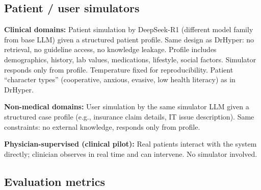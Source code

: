 \documentclass[11pt,a4paper]{article}
\newcommand{\placeholder}[1]{%
  \begin{tcolorbox}[colback=yellow!10,colframe=orange!60!black,
    fonttitle=\bfseries,title=Placeholder]
    #1
  \end{tcolorbox}%
}
\begin{document}
\subsection{Patient / user simulators}
\label{sec:methods_simulators}

\placeholder{%
  \textbf{Clinical domains:}
  Patient simulation by DeepSeek-R1 (different model family from base LLM)
  given a structured patient profile. Same design as DrHyper: no retrieval,
  no guideline access, no knowledge leakage. Profile includes demographics,
  history, lab values, medications, lifestyle, social factors. Simulator
  responds only from profile. Temperature fixed for reproducibility.
  Patient ``character types'' (cooperative, anxious, evasive, low health
  literacy) as in DrHyper.

  \textbf{Non-medical domains:}
  User simulation by the same simulator LLM given a structured case profile
  (e.g., insurance claim details, IT issue description). Same constraints:
  no external knowledge, responds only from profile.

  \textbf{Physician-supervised (clinical pilot):}
  Real patients interact with the system directly; clinician observes in
  real time and can intervene. No simulator involved.
}

\subsection{Evaluation metrics}
\label{sec:methods_metrics}
\end{document}
